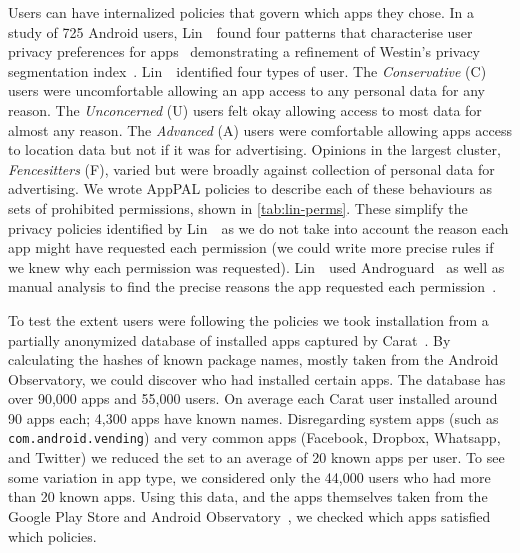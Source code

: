\documentclass[thesis.tex]{subfiles}
\begin{document}
Users can have internalized policies that govern which apps they
chose.  In a study of 725 Android users, Lin~\etal~found four patterns
that characterise user privacy preferences for
apps~\cite{lin_modeling_2014} demonstrating a refinement of Westin's
privacy segmentation index~\cite{harris_interactive_privacy_2002}.
Lin~\etal~identified four types of user.  The \emph{Conservative} (C)
users were uncomfortable allowing an app access to any personal data
for any reason.  The \emph{Unconcerned} (U) users felt okay allowing
access to most data for almost any reason.  The \emph{Advanced} (A)
users were comfortable allowing apps access to location data but not
if it was for advertising.  Opinions in the largest cluster,
\emph{Fencesitters} (F), varied but were broadly against collection of
personal data for advertising.  We wrote AppPAL policies to describe
each of these behaviours as sets of prohibited permissions, shown in
\autoref{tab:lin-perms}.  These simplify the privacy policies
identified by Lin~\etal~as we do not take into account the reason each
app might have requested each permission (we could write more
precise rules if we knew why each permission was
requested).  Lin~\etal~used
Androguard~\cite{andrew_desnos_androguard_2012} as well as manual
analysis to find the precise reasons the app requested each
permission~\cite{lin_modeling_2014}.

To test the extent users were following the policies we took installation from a partially anonymized database of installed apps captured by Carat~\cite{oliner_carat:_2013}.
By calculating the hashes of known package names, mostly taken from the Android Observatory, we could discover who had installed certain apps.
The database has over 90,000 apps and 55,000 users.
On average each Carat user installed around 90 apps each; 4,300 apps have known names.
Disregarding system apps (such as \texttt{com.android.vending}) and very common apps (Facebook, Dropbox, Whatsapp, and Twitter) we reduced the set to an average of 20 known apps per user.
To see some variation in app type, we considered only the 44,000 users who had more than 20 known apps.
Using this data, and the apps themselves taken from the Google Play Store and Android Observatory~\cite{barrera_understanding_2012}, we checked which apps satisfied which policies.
\end{document}
